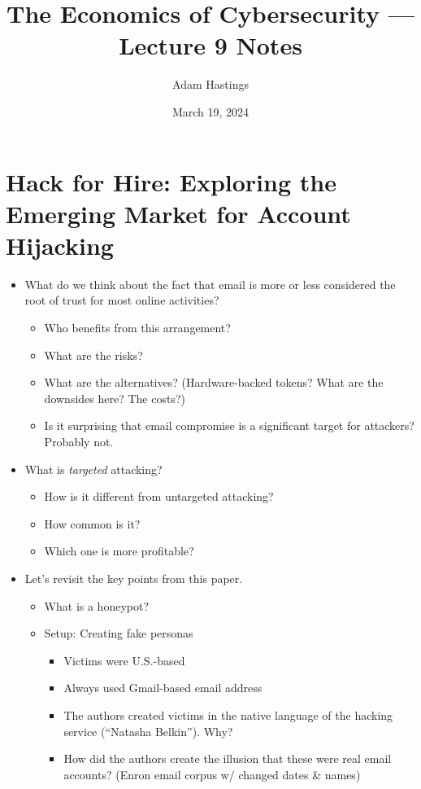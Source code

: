 \documentclass[11pt]{article}
\title{The Economics of Cybersecurity --- Lecture 9 Notes}
\date{March 19, 2024}
\author{Adam Hastings}
\begin{document}
\maketitle



\section{Hack for Hire: Exploring the Emerging Market for Account Hijacking}


\begin{itemize}
    \item What do we think about the fact that email is more or less considered the root of trust for most online activities?
    \begin{itemize}
        \item Who benefits from this arrangement?
        \item What are the risks?
        \item What are the alternatives? (Hardware-backed tokens? What are the downsides here? The costs?)
        \item Is it surprising that email compromise is a significant target for attackers? Probably not. 
    \end{itemize}
    \item What is {\it targeted } attacking? 
    \begin{itemize}
        \item How is it different from untargeted attacking?
        \item How common is it?
        \item Which one is more profitable?
    \end{itemize}
    \item Let's revisit the key points from this paper. 
    \begin{itemize}
        \item What is a honeypot?
        \item Setup: Creating fake personas
        \begin{itemize}
            \item Victims were U.S.-based
            \item Always used Gmail-based email address 
            \item The authors created victims in the native language of the hacking service (``Natasha Belkin''). Why?
            \item How did the authors create the illusion that these were real email accounts? (Enron email corpus w/ changed dates \& names)

\end{itemize}
\end{itemize}
\end{itemize}
\end{document}
